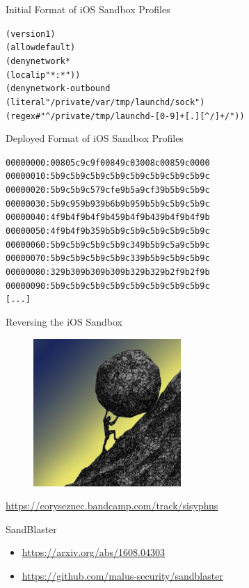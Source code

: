 \documentclass{simple}
\begin{document}
\begin{frame}[fragile]{Initial Format of iOS Sandbox Profiles}
  \begin{alltt}
(version 1)
(allow default)
(deny network*
        (local ip "*:*"))
(deny network-outbound
        (literal "/private/var/tmp/launchd/sock")
        (regex #"^/private/tmp/launchd-[0-9]+[.][^/]+/"))
  \end{alltt}
\end{frame}

\begin{frame}[fragile]{Deployed Format of iOS Sandbox Profiles}
  \begin{alltt}
00000000: 0080 5c9c 9f00 849c 0300 8c00 859c 0000
00000010: 5b9c 5b9c 5b9c 5b9c 5b9c 5b9c 5b9c 5b9c
00000020: 5b9c 5b9c 579c fe9b 5a9c f39b 5b9c 5b9c
00000030: 5b9c 959b 939b 6b9b 959b 5b9c 5b9c 5b9c
00000040: 4f9b 4f9b 4f9b 459b 4f9b 439b 4f9b 4f9b
00000050: 4f9b 4f9b 359b 5b9c 5b9c 5b9c 5b9c 5b9c
00000060: 5b9c 5b9c 5b9c 5b9c 349b 5b9c 5a9c 5b9c
00000070: 5b9c 5b9c 5b9c 5b9c 339b 5b9c 5b9c 5b9c
00000080: 329b 309b 309b 309b 329b 329b 2f9b 2f9b
00000090: 5b9c 5b9c 5b9c 5b9c 5b9c 5b9c 5b9c 5b9c
[...]
  \end{alltt}
\end{frame}

\begin{frame}{Reversing the iOS Sandbox}
  \begin{figure}
    \centering
    \includegraphics[width=0.5\textwidth]{img/sisyphus}
  \end{figure}
  \begin{center}
    \tiny
    \url{https://coryseznec.bandcamp.com/track/sisyphus}
  \end{center}
  \vspace{0.5cm}
  \pause SandBlaster
  \begin{itemize}
    \item \pause \url{https://arxiv.org/abs/1608.04303}
    \item \pause \url{https://github.com/malus-security/sandblaster}
  \end{itemize}
\end{frame}
\end{document}
